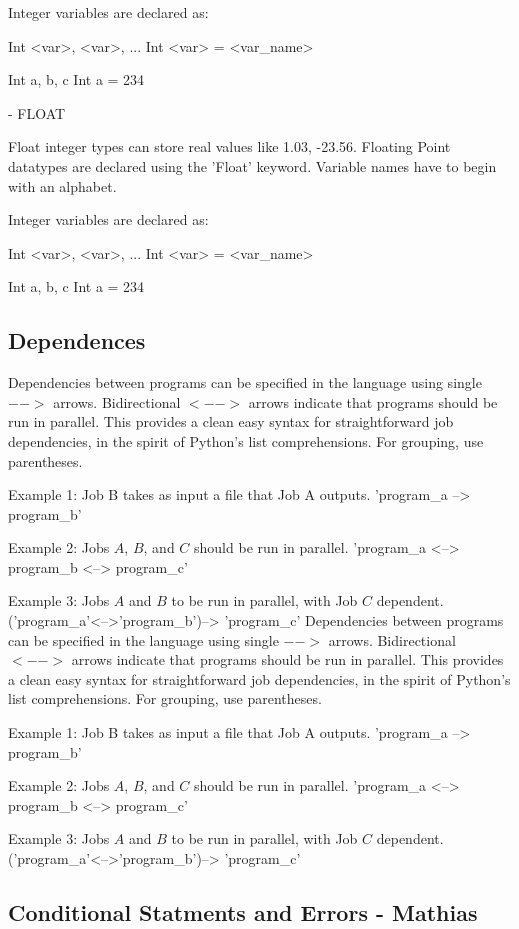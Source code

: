 Integer variables are declared as:

Int <var>, <var>, ...
Int <var> = <var_name>

Int a, b, c
Int a = 234


- FLOAT

Float integer types can store real values like 1.03, -23.56. Floating Point datatypes are declared using the 'Float' keyword. Variable names have to begin with an alphabet.

Integer variables are declared as:

Int <var>, <var>, ...
Int <var> = <var_name>

Int a, b, c
Int a = 234




\subsection{Dependences}
Dependencies between programs can be specified in the language using single $-->$ arrows. Bidirectional $<-->$ arrows indicate that programs should be run in parallel. This provides a clean easy syntax for straightforward job dependencies, in the spirit of Python's list comprehensions. For grouping, use parentheses.

Example 1:
Job B takes as input a file that Job A outputs. 'program_a --> program_b'

Example 2: 
Jobs $A$, $B$, and $C$ should be run in parallel. 'program_a <--> program_b <--> program_c'

Example 3:
Jobs $A$ and $B$ to be run in parallel, with Job $C$ dependent. ('program_a'<-->'program_b')--> 'program_c'
Dependencies between programs can be specified in the language using single $-->$ arrows. Bidirectional $<-->$ arrows indicate that programs should be run in parallel. This provides a clean easy syntax for straightforward job dependencies, in the spirit of Python's list comprehensions. For grouping, use parentheses.

Example 1:
Job B takes as input a file that Job A outputs. 'program_a --> program_b'

Example 2: 
Jobs $A$, $B$, and $C$ should be run in parallel. 'program_a <--> program_b <--> program_c'

Example 3:
Jobs $A$ and $B$ to be run in parallel, with Job $C$ dependent. ('program_a'<-->'program_b')--> 'program_c'
\subsection{Conditional Statments and Errors - Mathias}

